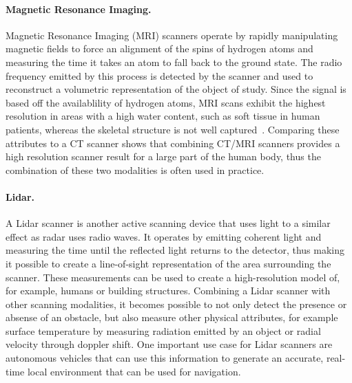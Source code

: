 \paragraph{Magnetic Resonance Imaging. }  Magnetic Resonance Imaging (MRI) scanners operate by rapidly manipulating magnetic fields to force an alignment of the spins of hydrogen atoms and measuring the time it takes an atom to fall back to the ground state.  The radio frequency emitted by this process is detected by the scanner and used to reconstruct a  volumetric representation of the object of study.  Since the signal is based off the availablility of hydrogen atoms, MRI scans exhibit the highest resolution in areas with a high water content, such as soft tissue in human patients, whereas the skeletal structure is not well captured~\cite{damadian1971tumor}.  Comparing these attributes to a CT scanner shows that combining CT/MRI scanners provides a high resolution scanner result for a large part of the human body, thus the combination of these two modalities is often used in practice.

\paragraph{Lidar. }  A Lidar scanner is another active scanning device that uses light to a similar effect as radar uses radio waves.  It operates by emitting coherent light and measuring the time until the reflected light returns to the detector, thus making it possible to create a  line-of-sight representation of the area surrounding the scanner.  These measurements can be used to create a high-resolution  model of, for example, humans or building structures.  Combining a Lidar scanner with other scanning modalities, it becomes possible to not only detect the presence or absense of an obstacle, but also measure other physical attributes, for example surface temperature by measuring radiation emitted by an object or radial velocity through doppler shift.  One important use case for Lidar scanners are autonomous vehicles that can use this information to generate an accurate, real-time  local environment that can be used for navigation.

